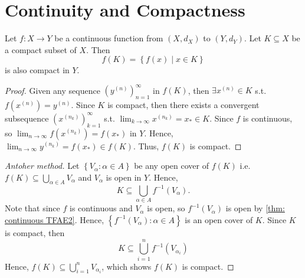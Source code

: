 \section{Continuity and Compactness}
\begin{theorem} \label{thm: continuous func map compact subset to another compact subset}
    Let \(f : X \to Y\) be a continuous function from \((X, d_X)\) to \((Y, d_Y)\). Let \(K \subseteq X\) be a compact subset of \(X\). Then
    \[
        f(K) = \left\{ f(x) \mid x \in K \right\} 
    \] is also compact in \(Y\).     
\end{theorem}
\begin{proof}
    Given any sequence \(\left( y^{(n)} \right)_{n=1}^\infty  \) in \(f(K)\), then \(\exists x^{(n)} \in K\) s.t. \(f \left( x^{(n)} \right) = y^{(n)} \). Since \(K\) is compact, then there exists a convergent subsequence \(\left( x^{(n_k)} \right)_{k=1}^{\infty}  \) s.t. \(\lim_{k \to \infty} x^{(n_k)} = x_{\ast} \in K \). Since \(f\) is continuous, so \(\lim_{n \to \infty} f \left( x^{(n_k)} \right) = f \left( x_{\ast}  \right)   \) in \(Y\). Hence, \(\lim_{n \to \infty} y^{(n_k)} = f(x_{\ast} ) \in f(K)\). Thus, \(f(K)\) is compact. 
\end{proof}
\begin{proof}[Antoher method]
    Let \(\left\{ V_\alpha : \alpha \in A \right\} \) be any open cover of \(f(K)\) i.e. \(f(K) \subseteq \bigcup_{\alpha \in A} V_\alpha  \) and \(V_\alpha \) is open in \(Y\). Hence, 
    \[
        K \subseteq \bigcup_{\alpha \in A} f^{-1}(V_\alpha ).  
    \]  Note that since \(f\) is continuous and \(V_\alpha \) is open, so \(f^{-1}(V_\alpha ) \) is open by \autoref{thm: continuous TFAE2}. Hence, \(\left\{ f^{-1}(V_\alpha ) : \alpha \in A \right\} \) is an open cover of \(K\). Since \(K\) is compact, then 
    \[
        K \subseteq \bigcup_{i=1}^n f^{-1}\left( V_{\alpha _i} \right)   
    \] Hence, \(f(K) \subseteq \bigcup_{i=1}^{n} V_{\alpha _i} \), which shows \(f(K)\) is compact.        
\end{proof}